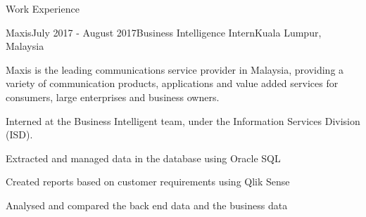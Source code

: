 \documentclass{resume} %
\begin{document}

\begin{rSection}{Work Experience}

\begin{rSubsection}{Maxis}{July 2017 - August 2017}{Business Intelligence Intern}{Kuala Lumpur, Malaysia}
\item Maxis is the leading communications service provider in Malaysia, providing a variety of communication products, applications and value added services for consumers, large enterprises and business owners.
\item Interned at the Business Intelligent team, under the Information Services Division (ISD).
\item Extracted and managed data in the database using Oracle SQL
\item Created reports based on customer requirements using Qlik Sense
\item Analysed and compared the back end data and the business data
\end{rSubsection}

\end{rSection}

\end{document}
